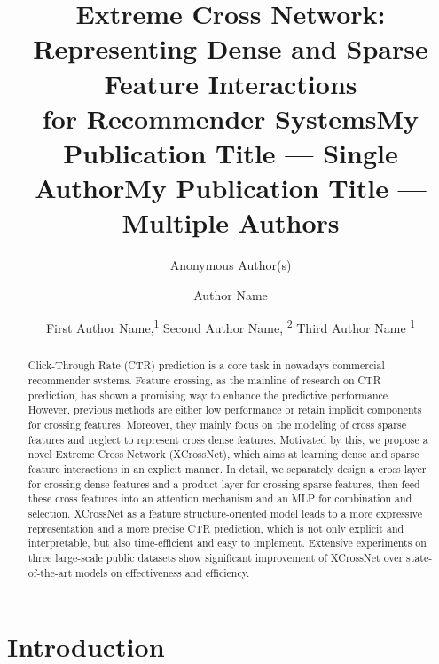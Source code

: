 \documentclass[letterpaper]{article} \usepackage{aaai21}  \usepackage{times}  \usepackage{helvet} \usepackage{courier}  \usepackage[hyphens]{url}  \usepackage{graphicx} \urlstyle{rm} \def\UrlFont{\rm}  \usepackage{natbib}  \usepackage{caption} \frenchspacing  \setlength{\pdfpagewidth}{8.5in}  \setlength{\pdfpageheight}{11in}  \usepackage{graphicx}
\title{Extreme Cross Network: Representing Dense and Sparse Feature Interactions \\for Recommender Systems}
\author{

Anonymous Author(s)
}
\title{My Publication Title --- Single Author}
\author {
Author Name \\
}
\title{My Publication Title --- Multiple Authors}
\author {


        First Author Name,\textsuperscript{\rm 1}
        Second Author Name, \textsuperscript{\rm 2}
        Third Author Name \textsuperscript{\rm 1} \\
}
\begin{document}
\maketitle

\begin{abstract}
	\vspace{-0.1cm}
Click-Through Rate (CTR) prediction is a core task in nowadays commercial recommender systems. Feature crossing, as the mainline of research on CTR prediction, has shown a promising way to enhance the predictive performance.
However, previous methods are either low performance or retain implicit components for crossing features. Moreover, they mainly focus on the modeling of cross sparse features and neglect to represent cross dense features. 
Motivated by this, we propose a novel Extreme Cross Network (XCrossNet), which aims at learning dense and sparse feature interactions in an explicit manner. In detail, we separately design a cross layer for crossing dense features and a product layer for crossing sparse features, then feed these cross features into an attention mechanism and an MLP for combination and selection.
XCrossNet as a feature structure-oriented model leads to a more expressive representation and a more precise CTR prediction, which is not only explicit and interpretable, but also time-efficient and easy to implement.
Extensive experiments on three large-scale public datasets show significant improvement of XCrossNet over state-of-the-art models on effectiveness and efficiency.
\vspace{-0.4cm}
\end{abstract}




\section{Introduction}
\end{document}
